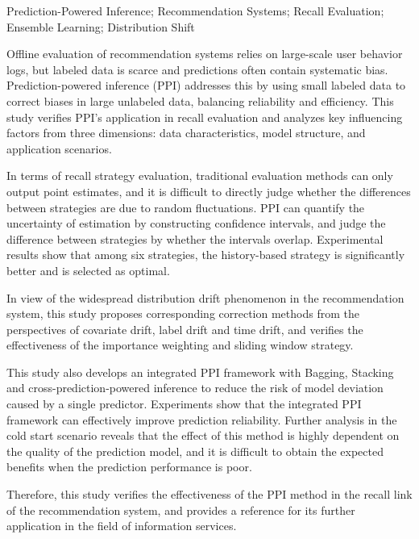 \documentclass[a4paper, AutoFakeBold, UTF8]{ctexrep}
\theoremstyle{plain}
\numberwithin{equation}{chapter}
\begin{document}
\begin{abstractEng}{Prediction-Powered Inference;  Recommendation Systems;  Recall Evaluation;  Ensemble Learning;  Distribution Shift}

Offline evaluation of recommendation systems relies on large-scale user behavior logs, but labeled data is scarce and predictions often contain systematic bias. Prediction-powered inference  (PPI)  addresses this by using small labeled data to correct biases in large unlabeled data, balancing reliability and efficiency. This study verifies PPI's application in recall evaluation and analyzes key influencing factors from three dimensions: data characteristics, model structure, and application scenarios.

In terms of recall strategy evaluation, traditional evaluation methods can only output point estimates, and it is difficult to directly judge whether the differences between strategies are due to random fluctuations. PPI can quantify the uncertainty of estimation by constructing confidence intervals, and judge the difference between strategies by whether the intervals overlap. Experimental results show that among six strategies, the history-based strategy is significantly better and is selected as optimal.

In view of the widespread distribution drift phenomenon in the recommendation system, this study proposes corresponding correction methods from the perspectives of covariate drift, label drift and time drift, and verifies the effectiveness of the importance weighting and sliding window strategy. 

This study also develops an integrated PPI framework with Bagging, Stacking and cross-prediction-powered inference to reduce the risk of model deviation caused by a single predictor. Experiments show that the integrated PPI framework can effectively improve prediction reliability. Further analysis in the cold start scenario reveals that the effect of this method is highly dependent on the quality of the prediction model, and it is difficult to obtain the expected benefits when the prediction performance is poor. 
 
Therefore, this study verifies the effectiveness of the PPI method in the recall link of the recommendation system, and provides a reference for its further application in the field of information services.
\end{abstractEng}

\tableofcontents
\thispagestyle{empty}
\clearpage
\end{document}
